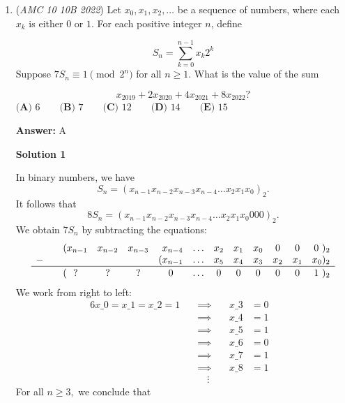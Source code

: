 \begin{enumerate}
 



\textbf{Solution 4 (Translation)}

Consider $g(x) = f(x)-f(300)$. Then $g(x)$ satisfies all the conditions and $g(300) = g(900) = 0$. We would want $g(400)$ and $g(800)$ as distant from each other as possible. So assign $g(400) = -50$ and $g(800) = 50$, the possible lower and upper bounds respectively. It follows that one can obtain the upper bound for $|g(g(800)) - g(g(400))| = |g(50) - g(-50  )| \leq \frac{1}{2}(100) = \boxed{\textbf{(B)}\ 50}$ as the answer.

 


	\item (\textit{AMC 10 10B 2022}) Let $x_0,x_1,x_2,\dotsc$ be a sequence of numbers, where each $x_k$ is either $0$ or $1$. For each positive integer $n$, define 

 \[S_n = \sum_{k=0}^{n-1} x_k 2^k\]
Suppose $7S_n \equiv 1 \pmod{2^n}$ for all $n \geq 1$. What is the value of the sum  

 \[x_{2019} + 2x_{2020} + 4x_{2021} + 8x_{2022}?\]
$\textbf{(A) } 6 \qquad \textbf{(B) } 7 \qquad \textbf{(C) }12\qquad \textbf{(D) } 14\qquad \textbf{(E) }15$

 \textbf{Answer: }A



\textbf{Solution 1}

In binary numbers, we have 
 \[S_n = (x_{n-1} x_{n-2} x_{n-3} x_{n-4} \ldots x_{2} x_{1} x_{0})_2.\]It follows that 
 \[8S_n = (x_{n-1} x_{n-2} x_{n-3} x_{n-4} \ldots x_{2} x_{1} x_{0}000)_2.\]We obtain $7S_n$ by subtracting the equations:
 \[\begin{array}{clccrccccccr}   & (x_{n-1} & x_{n-2} & x_{n-3} & x_{n-4} & \ldots & x_2 & x_1 & x_0 & 0 & 0 & 0 \ )_2 \\ -\quad & & & & (x_{n-1} & \ldots & x_5 & x_4 & x_3 & x_2 & x_1 & x_0)_2 \\ \hline   & & & & & & & & & & &  \\ [-2.5ex]   & ( \ \ ?& ? & ? & 0 \ \ \ & \ldots & 0 & 0 & 0 & 0 & 0 & 1 \ )_2 \\ \end{array}\]We work from right to left:
 \begin{alignat*}{6} x\_0=x\_1=x\_2=1  \quad &\implies \quad &x\_3 &= 0& \\  \quad &\implies \quad &x\_4 &= 1& \\  \quad &\implies \quad &x\_5 &= 1& \\ \quad &\implies \quad &x\_6 &= 0& \\  \quad &\implies \quad &x\_7 &= 1& \\  \quad &\implies \quad &x\_8 &= 1& \\ \quad &\quad \vdots & & & \end{alignat*}For all $n\geq3,$ we conclude that


\end{enumerate}
